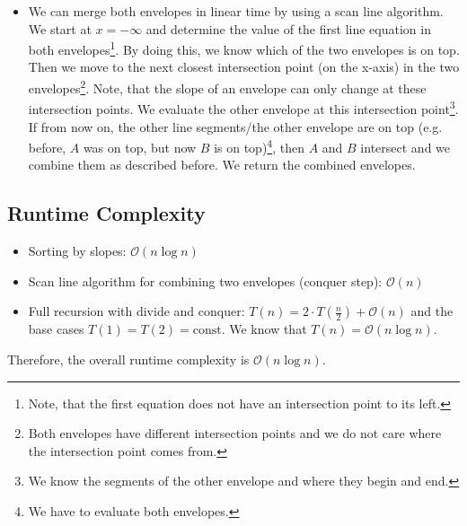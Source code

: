 \documentclass[12pt]{article}
\begin{document}
\begin{itemize}
\begin{itemize}
	\item We can merge both envelopes in linear time by using a scan line algorithm. We start at $x=-\infty$ and determine the value of the first line equation in both envelopes\footnote{Note, that the first equation does not have an intersection point to its left.}. By doing this, we know which of the two envelopes is on top. Then we move to the next closest intersection point (on the x-axis) in the two envelopes\footnote{Both envelopes have different intersection points and we do not care where the intersection point comes from.}. Note, that the slope of an envelope can only change at these intersection points. We evaluate the other envelope at this intersection point\footnote{We know the segments of the other envelope and where they begin and end.}. If from now on, the other line segments/the other envelope are on top (e.g. before, $A$ was on top, but now $B$ is on top)\footnote{We have to evaluate both envelopes.}, then $A$ and $B$ intersect and we combine them as described before. We return the combined envelopes.
	\end{itemize} 
\end{itemize}

\subsection*{Runtime Complexity}
\begin{itemize}
	\item Sorting by slopes: $\mathcal{O}(n \log n)$
	\item Scan line algorithm for combining two envelopes (conquer step): $\mathcal{O}(n)$
	\item Full recursion with divide and conquer: $T(n) = 2 \cdot T(\frac{n}{2}) + \mathcal{O}(n)$ and the base cases $T(1) = T(2) = \mbox{const}$. We know that $T(n) = \mathcal{O}(n \log n)$.
\end{itemize}

Therefore, the overall runtime complexity is $\mathcal{O}(n \log n)$.
\end{document}
